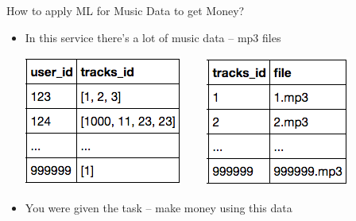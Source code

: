 \documentclass{beamer}
\begin{document}
\begin{frame}{How to apply ML for Music Data to get Money?}
\begin{itemize}
\begin{center}
		\end{center}
		 \item   In this service there's a lot of music data -- mp3 files
		\begin{center}
			 \includegraphics[scale=0.4]{img/u2t}~~~~  \includegraphics[scale=0.4]{img/t2f} 
		\end{center}
		 \item   You were given the task -- make money using this data
	\end{itemize}
\end{frame}
\end{document}

